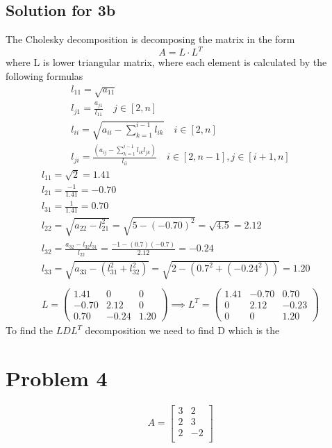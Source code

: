 \documentclass[a4paper,fleqn,12pt]{article}
\begin{document}
\subsection{Solution for 3b}
The Cholesky decomposition is decomposing the matrix in the form 
$$
A = L \cdot L^T
$$
where L is lower triangular matrix, where each element is calculated by the following formulas
\begin{gather*}
l_{11} = \sqrt{a_{11}}   \\
l_{j1} = \frac{a_{j1}}{l_{11}} \quad  j \in [2, n] \\
l_{ii} = \sqrt{a_{ii} - \sum_{k=1} ^{i-1} l_{ik}} \quad i \in [2, n] \\
l_{ji} = \frac{ \left( a_{ij} - \sum_{k=1} ^{i-1} l_{ik} l_{jk} \right)}{l_{ii}} \quad i \in [2, n-1], j \in [i+1, n]
\end{gather*}
\newpage
\begin{gather*}
l_{11} = \sqrt{2} = 1.41 \\
l_{21} = \frac{-1}{1.41} = - 0.70 \\
l_{31} = \frac{1}{1.41}  = 0.70 \\
l_{22} = \sqrt{a_{22} - l_{21} ^2} = \sqrt{5 - (-0.70)^2} = \sqrt{4.5} = 2.12 \\
l_{32} = \frac{a_{32} - l_{32}l_{31}}{l_{22}} = \frac{-1 -(0.7)(-0.7)}{2.12} = -0.24 \\
l_{33} = \sqrt{a_{33} - (l_{31} ^2 + l_{32} ^2)} = \sqrt{2 - (0.7^2 + (-0.24^2))} = 1.20\\
\\
L = 
\begin{pmatrix}
1.41 & 0 & 0 \\
-0.70 & 2.12 & 0 \\
0.70 & -0.24 & 1.20 
\end{pmatrix} \implies  
L^T = \begin{pmatrix}
1.41 & -0.70 & 0.70 \\
0 & 2.12 & -0.23 \\
0 & 0 & 1.20
\end{pmatrix}
\end{gather*}
To find the $LDL^T$ decomposition we need to find D which is the 
\newpage

\section{Problem 4}
$$
A = \begin{bmatrix}
3 & 2 \\
2 & 3 \\
2 & -2 \\
\end{bmatrix}
$$
\end{document}
